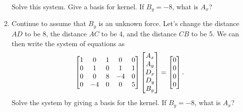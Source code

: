 \begin{problem}[Statics]
\begin{enumerate}
Solve this system. Give a basis for kernel. If $B_y=-8$, what is $A_x$? 
 \item Continue to assume that $B_y$ is an unknown force. Let's change the distance $AD$ to be 8, the distance $AC$ to be 4, and the distance $CB$ to be 5. We can then write the system of equations as 
$$\begin{bmatrix} 
1&0&1&0&0\\
0&1&0&1&1\\
0&0&8&-4&0\\
0&-4&0&0&5
 \end{bmatrix}
\begin{bmatrix} A_x\\A_y\\D_x\\D_y\\B_y \end{bmatrix}
=\begin{bmatrix} 0\\0\\0\\0 \end{bmatrix}.$$
Solve the system by giving a basis for the kernel. If $B_y=-8$, what is $A_x$?
\end{enumerate}
\end{problem}





